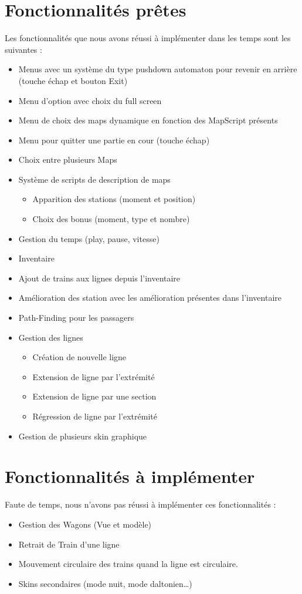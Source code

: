 \documentclass[report, backcover, french, nodocumentinfo]{upmethodology-document}
\begin{document}
	\section{Fonctionnalités prêtes}
		\p{}
		Les fonctionnalités que nous avons réussi à implémenter dans les temps sont les suivantes : 
		\begin{itemize}
			\item Menus avec un système du type pushdown automaton pour revenir en arrière (touche échap et bouton Exit)
			\item Menu d'option avec choix du full screen
			\item Menu de choix des maps dynamique en fonction des MapScript présents
			\item Menu pour quitter une partie en cour (touche échap)
			\item Choix entre plusieurs Maps
			\item Système de scripts de description de maps
				\begin{itemize}
					\item Apparition des stations (moment et position)
					\item Choix des bonus (moment, type et nombre)
				\end{itemize}
			\item Gestion du temps (play, pause, vitesse)
			\item Inventaire
			\item Ajout de trains aux lignes depuis l'inventaire
			\item Amélioration des station avec les amélioration présentes dans l'inventaire
			\item Path-Finding pour les passagers
			\item Gestion des lignes
				\begin{itemize}
					\item Création de nouvelle ligne
					\item Extension de ligne par l'extrémité
					\item Extension de ligne par une section
					\item Régression de ligne par l'extrémité
				\end{itemize}
			\item Gestion de plusieurs skin graphique
		\end{itemize}
	\section{Fonctionnalités à implémenter}
		\p{}
		Faute de temps, nous n'avons pas réussi à implémenter ces fonctionnalités : 
		\begin{itemize}
			\item Gestion des Wagons (Vue et modèle)
			\item Retrait de Train d'une ligne
			\item Mouvement circulaire des trains quand la ligne est circulaire.
			\item Skins secondaires (mode nuit, mode daltonien\ldots)
		\end{itemize}
\end{document}

